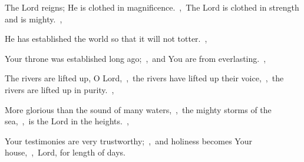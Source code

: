 \documentclass[12pt,twoside,a5paper]{article}
\begin{document}
\begin{halfparskip}
   The Lord reigns; He is clothed in magnificence.~\sep\ The Lord is clothed in strength and is mighty.~\sep


  He has established the world so that it will not totter.~\sep

  Your throne was established long ago;~\sep\ and You are from everlasting.~\sep

  The rivers are lifted up, O Lord,~\sep\ the rivers have lifted up their voice,~\sep\ the rivers are lifted up in purity.~\sep

  More glorious than the sound of many waters,~\sep\ the mighty storms of the sea,~\sep\ is the Lord in the heights.~\sep

  Your testimonies are very trustworthy;~\sep\ and holiness becomes Your house,~\sep\ Lord, for length of days.
\end{halfparskip}
\end{document}
